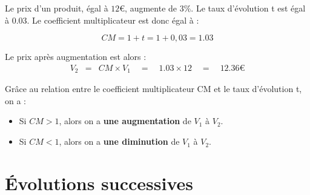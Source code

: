 \begin{ex}{}{}
Le prix d'un produit, égal à $12$€, augmente de $3\%$. Le taux d'évolution t est égal à 0.03. 
Le coefficient multiplicateur est donc égal à :

$$CM = 1 + t = 1 + 0,03 = 1.03$$

\noindent Le prix après augmentation est alors :
\begin{eqnarray*}
V_{2} &=& CM\times V_{1} \quad = \quad 1.03\times 12 \quad = \quad 12.36\text{€}
\end{eqnarray*}
\end{ex}

\begin{rem}{}{}
Grâce au relation entre le coefficient multiplicateur CM et le taux d'évolution t, on a :
\begin{itemize}
\item[-] Si $CM > 1$, alors  on a \textbf{une augmentation} de $V_{1}$ à $V_{2}$. 
\item[-] Si $CM < 1$, alors  on a \textbf{une diminution} de $V_{1}$ à $V_{2}$.
\end{itemize}
\end{rem}

\section{Évolutions successives}

